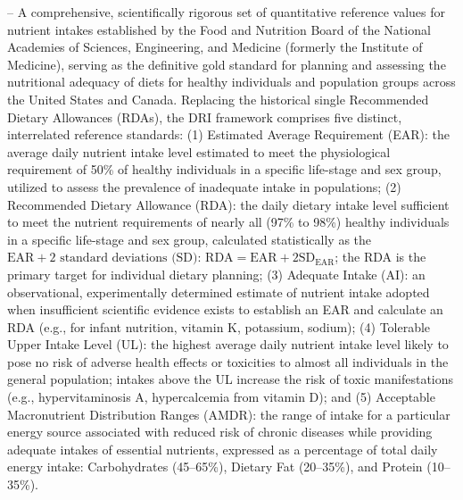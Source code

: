 -- A comprehensive, scientifically rigorous set of quantitative reference values for nutrient intakes established by the Food and Nutrition Board of the National Academies of Sciences, Engineering, and Medicine (formerly the Institute of Medicine), serving as the definitive gold standard for planning and assessing the nutritional adequacy of diets for healthy individuals and population groups across the United States and Canada. Replacing the historical single Recommended Dietary Allowances (RDAs), the DRI framework comprises five distinct, interrelated reference standards: (1) Estimated Average Requirement (EAR): the average daily nutrient intake level estimated to meet the physiological requirement of 50\% of healthy individuals in a specific life-stage and sex group, utilized to assess the prevalence of inadequate intake in populations; (2) Recommended Dietary Allowance (RDA): the daily dietary intake level sufficient to meet the nutrient requirements of nearly all (97\% to 98\%) healthy individuals in a specific life-stage and sex group, calculated statistically as the $\text{EAR} + 2\text{ standard deviations (SD)}$: $\text{RDA} = \text{EAR} + 2\text{SD}_{\text{EAR}}$; the RDA is the primary target for individual dietary planning; (3) Adequate Intake (AI): an observational, experimentally determined estimate of nutrient intake adopted when insufficient scientific evidence exists to establish an EAR and calculate an RDA (e.g., for infant nutrition, vitamin K, potassium, sodium); (4) Tolerable Upper Intake Level (UL): the highest average daily nutrient intake level likely to pose no risk of adverse health effects or toxicities to almost all individuals in the general population; intakes above the UL increase the risk of toxic manifestations (e.g., hypervitaminosis A, hypercalcemia from vitamin D); and (5) Acceptable Macronutrient Distribution Ranges (AMDR): the range of intake for a particular energy source associated with reduced risk of chronic diseases while providing adequate intakes of essential nutrients, expressed as a percentage of total daily energy intake: Carbohydrates (45--65\%), Dietary Fat (20--35\%), and Protein (10--35\%).

